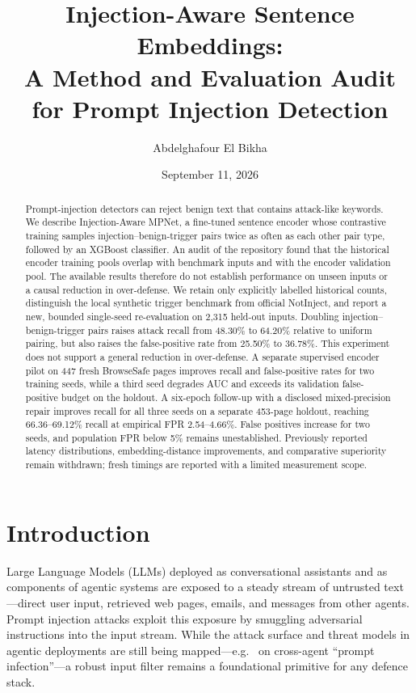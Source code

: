 \documentclass[11pt, a4paper]{article}
\title{Injection-Aware Sentence Embeddings:\\
       A Method and Evaluation Audit for Prompt Injection Detection}
\author{Abdelghafour El Bikha}
\affil{John Jay College}
\date{September 11, 2026}
\begin{document}
\maketitle

\begin{abstract}
Prompt-injection detectors can reject benign text that contains attack-like
keywords. We describe Injection-Aware MPNet, a fine-tuned sentence encoder
whose contrastive training samples injection--benign-trigger pairs twice as
often as each other pair type, followed by an XGBoost classifier. An audit
of the repository found that the historical encoder training pools overlap
with benchmark inputs and with the encoder validation pool. The available
results therefore do not establish performance on unseen inputs or a causal
reduction in over-defense. We retain only explicitly labelled historical
counts, distinguish the local synthetic trigger benchmark from official
NotInject, and report a new, bounded single-seed re-evaluation on 2,315
held-out inputs. Doubling injection--benign-trigger pairs raises attack
recall from 48.30\% to 64.20\% relative to uniform pairing, but also raises
the false-positive rate from 25.50\% to 36.78\%. This experiment does not
support a general reduction in over-defense. A separate supervised encoder
pilot on 447 fresh BrowseSafe pages improves recall and false-positive rates
for two training seeds, while a third seed degrades AUC and exceeds its
validation false-positive budget on the holdout. A six-epoch follow-up with
a disclosed mixed-precision repair improves recall for all three seeds on
a separate 453-page holdout, reaching 66.36--69.12\% recall at empirical
FPR 2.54--4.66\%. False positives increase for two seeds, and population
FPR below 5\% remains unestablished. Previously reported latency
distributions, embedding-distance improvements, and comparative superiority
remain withdrawn; fresh timings are reported with a limited measurement scope.

\end{abstract}

\section{Introduction}

Large Language Models (LLMs) deployed as conversational assistants and as
components of agentic systems are exposed to a steady stream of untrusted
text---direct user input, retrieved web pages, emails, and messages from
other agents. Prompt injection attacks exploit this exposure by smuggling
adversarial instructions into the input stream. While the attack surface and
threat models in agentic deployments are still being mapped---e.g.\
\citet{lee2024prompt} on cross-agent ``prompt infection''---a robust input
filter remains a foundational primitive for any defence stack.
\end{document}

